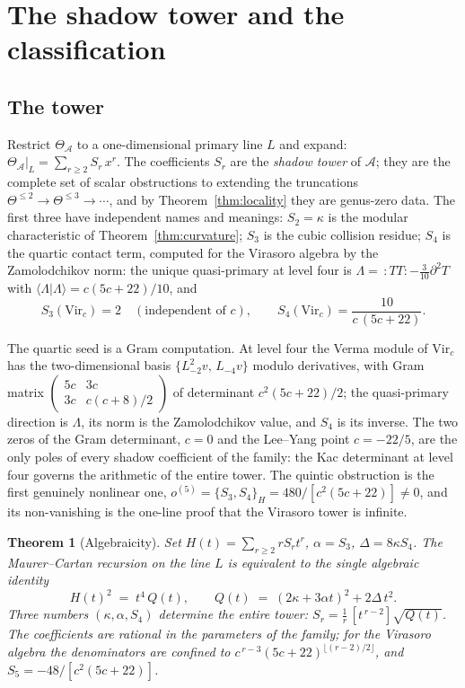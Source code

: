 \documentclass[11pt]{amsart}
\numberwithin{equation}{section}
\theoremstyle{plain}
\newtheorem{theorem}{Theorem}[section]
\theoremstyle{definition}
\theoremstyle{remark}
\newcommand{\cA}{\mathcal{A}}
\newcommand{\Vir}{\mathrm{Vir}}
\begin{document}
\section{The shadow tower and the classification}\label{sec:shadow}

\subsection{The tower}

Restrict $\Theta_{\cA}$ to a one-dimensional primary line $L$ and expand:
$\Theta_{\cA}|_{L}=\sum_{r\geq2}S_r\,x^{r}$. The coefficients $S_r$ are the
\emph{shadow tower} of $\cA$; they are the complete set of scalar
obstructions to extending the truncations
$\Theta^{\leq2}\to\Theta^{\leq3}\to\cdots$, and by
Theorem~\ref{thm:locality} they are genus-zero data. The first three have
independent names and meanings: $S_2=\kappa$ is the modular characteristic
of Theorem~\ref{thm:curvature}; $S_3$ is the cubic collision residue; $S_4$
is the quartic contact term, computed for the Virasoro algebra by the
Zamolodchikov norm: the unique quasi-primary at level four is
$\Lambda=\,:TT:-\tfrac{3}{10}\partial^{2}T$ with
$\langle\Lambda|\Lambda\rangle=c(5c+22)/10$, and
\begin{equation}\label{eq:S4}
S_3(\Vir_c)=2\quad(\text{independent of }c),
\qquad
S_4(\Vir_c)=\frac{10}{c\,(5c+22)}.
\end{equation}

The quartic seed is a Gram computation. At level four the Verma module
of $\Vir_c$ has the two-dimensional basis $\{L_{-2}^{2}v,\,L_{-4}v\}$
modulo derivatives, with Gram matrix
$\begin{pmatrix}5c&3c\\3c&c(c+8)/2\end{pmatrix}$ of determinant
$c^{2}(5c+22)/2$; the quasi-primary direction is $\Lambda$, its norm is
the Zamolodchikov value, and $S_4$ is its inverse. The two zeros of the
Gram determinant, $c=0$ and the Lee--Yang point $c=-22/5$, are the only
poles of every shadow coefficient of the family: the Kac determinant at
level four governs the arithmetic of the entire tower. The quintic
obstruction is the first genuinely nonlinear one,
$o^{(5)}=\{S_3,S_4\}_{H}=480/[c^{2}(5c+22)]\neq0$, and its
non-vanishing is the one-line proof that the Virasoro tower is
infinite.

\begin{theorem}[Algebraicity]\label{thm:riccati}
Set $H(t)=\sum_{r\geq2}rS_rt^{r}$, $\alpha=S_3$, $\Delta=8\kappa S_4$. The
Maurer--Cartan recursion on the line $L$ is equivalent to the single
algebraic identity
\begin{equation}\label{eq:riccati}
H(t)^{2}\;=\;t^{4}\,Q(t),
\qquad
Q(t)\;=\;(2\kappa+3\alpha t)^{2}+2\Delta\,t^{2}.
\end{equation}
Three numbers $(\kappa,\alpha,S_4)$ determine the entire tower:
$S_r=\tfrac1r\,[t^{\,r-2}]\sqrt{Q(t)}$. The coefficients are rational in
the parameters of the family; for the Virasoro algebra the denominators
are confined to $c^{\,r-3}(5c+22)^{\lfloor(r-2)/2\rfloor}$, and
$S_5=-48/[c^{2}(5c+22)]$.
\end{theorem}
\end{document}
